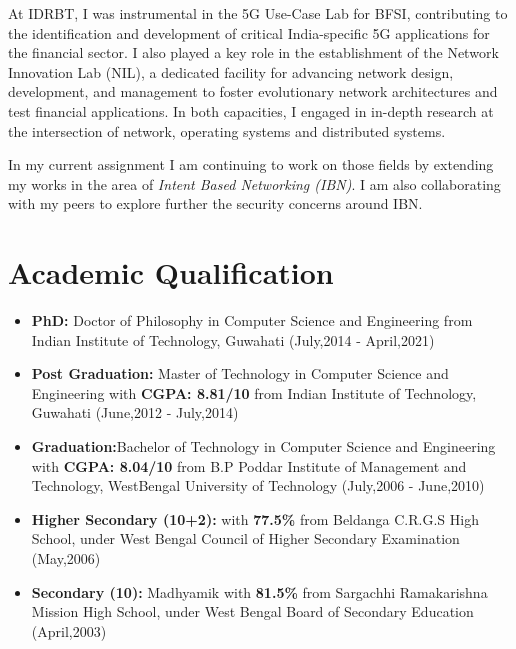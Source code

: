 \documentclass{article}
\begin{document}
At IDRBT, I was instrumental in the 5G Use-Case Lab for BFSI, contributing to the identification and development of critical India-specific 5G applications for the financial sector. I also played a key role in the establishment of the Network Innovation Lab (NIL), a dedicated facility for advancing network design, development, and management to foster evolutionary network architectures and test financial applications. In both capacities, I engaged in in-depth research at the intersection of network, operating systems and distributed systems. 

In my current assignment I am continuing to work on those fields by extending my works in the area of {\it Intent Based Networking (IBN)}. I am also collaborating with my peers to explore further the security concerns around IBN.  

\section{Academic Qualification} 
	\begin{itemize}
		\item{\bf PhD:} Doctor  of Philosophy in Computer Science and Engineering from Indian Institute of Technology, Guwahati (July,2014 - April,2021)
		\item{\bf Post Graduation:} Master of Technology in Computer Science and Engineering with {\bf CGPA: 8.81/10} from Indian Institute of Technology, Guwahati (June,2012 - July,2014)
		\item{\bf Graduation:}Bachelor of Technology in Computer Science and Engineering with {\bf CGPA: 8.04/10} from B.P Poddar Institute of Management and Technology, WestBengal University of Technology (July,2006 - June,2010)
		\item{\bf Higher Secondary (10+2):} with {\bf 77.5\%} from Beldanga C.R.G.S High School, under West Bengal Council of Higher Secondary Examination (May,2006)
		\item{\bf Secondary (10):} Madhyamik with {\bf 81.5\%} from Sargachhi Ramakarishna Mission High School, under West Bengal Board of Secondary Education (April,2003)
	\end{itemize}
\end{document}
